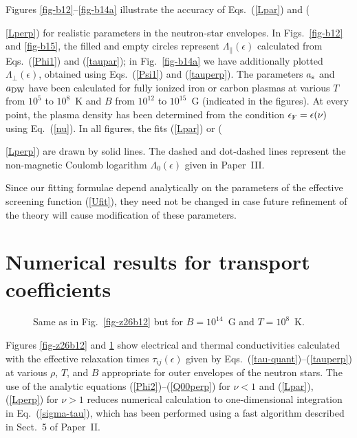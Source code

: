 \documentclass{aa}
\newcommand{\req}[1]{Eq.~(\ref{#1})}
\newcommand{\EF}{\epsilon_{\rm F}}
\begin{document}
Figures \ref{fig-b12}--\ref{fig-b14a} illustrate the accuracy of
Eqs.~(\ref{Lpar}) and ({\ref{Lperp}) for realistic parameters
in the neutron-star envelopes.
In Figs.~\ref{fig-b12} and \ref{fig-b15}, 
the filled and empty circles represent
$\Lambda_\|(\epsilon)$ calculated from Eqs.~(\ref{Phi1})
 and (\ref{taupar});
in Fig.~\ref{fig-b14a} we have additionally plotted
$\Lambda_\perp(\epsilon)$,
obtained using Eqs.~(\ref{Psi1}) and (\ref{tauperp}). The parameters
$a_{\rm s}$ and $a_{\rm DW}$ have been calculated for
fully ionized iron or carbon plasmas
at various $T$ from $10^5$ to $10^8$~K
and $B$ from $10^{12}$ to $10^{15}$~G (indicated in the figures).
At every point, the plasma density has been
determined from the condition $\EF=\epsilon(\nu)$ using \req{nu}.
In all figures,
the fits (\ref{Lpar}) or ({\ref{Lperp}) are drawn by solid lines.
The dashed and dot-dashed lines represent the non-magnetic
Coulomb logarithm $\Lambda_0(\epsilon)$
given in Paper~III.

Since our fitting formulae depend analytically on the parameters
of the effective screening function (\ref{Ufit}),
they need not be changed in case future refinement
of the theory will cause modification of these parameters.

\section{Numerical results for transport coefficients}
\label{sect-res}
\begin{figure}
\begin{center}
 \leavevmode
\epsfysize=85mm
\end{center}
\caption[]{Same as in Fig.~\protect\ref{fig-z26b12}
but for $B=10^{14}$~G and $T=10^8$~K.
}
\label{fig-z26b14t8}
\end{figure}

Figures \ref{fig-z26b12} and \ref{fig-z26b14t8} show
electrical and thermal conductivities calculated
with the effective relaxation times $\tau_{ij}(\epsilon)$
given by
Eqs.~(\ref{tau-quant})--(\ref{tauperp}) at various $\rho$, $T$, and $B$
appropriate for outer envelopes of the
neutron stars. The use of the
analytic equations (\ref{Phi2})--(\ref{Q00perp}) for $\nu < 1$ and
(\ref{Lpar}), (\ref{Lperp}) for $\nu > 1$
reduces numerical
calculation to one-dimensional integration
in \req{sigma-tau}, which has been performed using a fast algorithm
described in Sect.~5 of Paper~II.

}}
\end{document}

